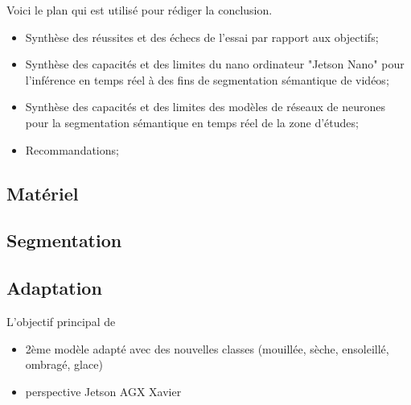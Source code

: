 ﻿{\color{red}
\par Voici le plan qui est utilisé pour rédiger la conclusion.
\begin{itemize}
   \item Synthèse des réussites et des échecs de l'essai par rapport aux objectifs;
   \item Synthèse des capacités et des limites du nano ordinateur "Jetson Nano" pour l'inférence en temps réel à des fins de segmentation sémantique de vidéos;
   \item Synthèse des capacités et des limites des modèles de réseaux de neurones pour la segmentation sémantique en temps réel de la zone d’études;
   \item Recommandations;
\end{itemize}
}
\subsection{Matériel}
\subsection{Segmentation}
\subsection{Adaptation}
L'objectif principal de 
\begin{itemize}
   \item 2ème modèle adapté avec des nouvelles classes (mouillée, sèche, ensoleillé, ombragé, glace)
   \item perspective Jetson AGX Xavier
\end{itemize}
